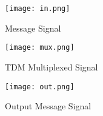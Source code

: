 \begin{figure}[H]
    \centering
    \texttt{[image: in.png]}
    \caption{Message Signal}
    \label{fig:img2}
\end{figure}

\begin{figure}[H]
    \centering
    \texttt{[image: mux.png]}
    \caption{TDM Multiplexed Signal}
    \label{fig:img11}
\end{figure}

\begin{figure}[H]
    \centering
    \texttt{[image: out.png]}
    \caption{Output Message Signal}
    \label{fig:img4}
\end{figure}
